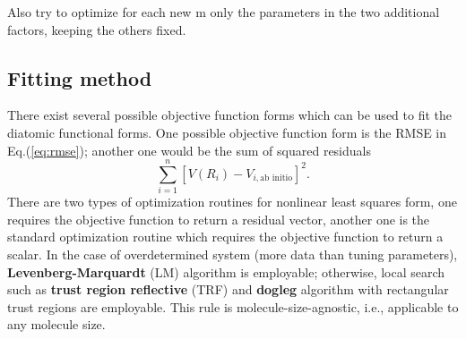 \documentclass[12pt]{article}
\def\att{                    %
        \marginpar[ \hspace*{\fill} \raisebox{-0.2em}{\rule{2mm}{1.2em}} ]
        {\raisebox{-0.2em}{\rule{2mm}{1.2em}} }
        }
\def\at#1{[*** \att #1 ***]}  %
\begin{document}
Also try to optimize for each new m only the parameters in the two additional factors, keeping the others fixed.

%

\subsection{Fitting method}
There exist several possible objective function forms which can be used to fit the diatomic functional forms. One possible objective function form is the RMSE in Eq.(\ref{eq:rmse}); another one would be the sum of squared residuals
\begin{equation}
    \sum^n_{i=1}\left[V(R_i) - V_{i,\text{ab initio}}\right]^2.
    \label{eq:sumsquaredresidual}
\end{equation}
There are two types of optimization routines for nonlinear least squares form, one requires the objective function to return a residual vector, another one is the standard optimization routine which requires the objective function to return a scalar. In the case of overdetermined system (more data than tuning parameters), \textbf{Levenberg-Marquardt} (LM) algorithm \cite{lm} is employable; otherwise, local search such as \textbf{trust region reflective} (TRF) \cite{trf} and \textbf{dogleg} algorithm with rectangular trust regions \cite{dogbox} are employable. This rule is molecule-size-agnostic, i.e., applicable to any molecule size.
\end{document}
